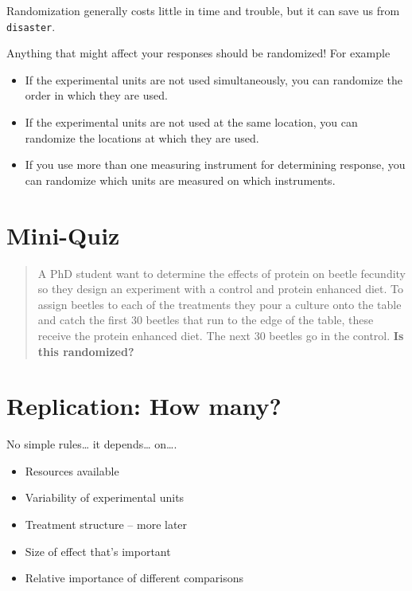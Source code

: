 \documentclass[
]{book}
\providecommand{\tightlist}{%
  \setlength{\itemsep}{0pt}\setlength{\parskip}{0pt}}
\begin{document}
Randomization generally costs little in time and trouble, but it can save us from \texttt{disaster}.

Anything that might affect your responses should be randomized! For example

\begin{itemize}
\tightlist
\item
  If the experimental units are not used simultaneously, you can randomize the order in which they are used.
\item
  If the experimental units are not used at the same location, you can randomize the locations at which they are used.
\item
  If you use more than one measuring instrument for determining response, you can randomize which units are measured on which instruments.
\end{itemize}

\hypertarget{mini-quiz}{%
\section{Mini-Quiz}\label{mini-quiz}}

\begin{quote}
A PhD student want to determine the effects of protein on beetle fecundity so they design an experiment with a control and protein enhanced diet. To assign beetles to each of the treatments they pour a culture onto the table and catch the first 30 beetles that run to the edge of the table, these receive the protein enhanced diet. The next 30 beetles go in the control. \textbf{Is this randomized?}
\end{quote}

\hypertarget{replication-how-many}{%
\section{Replication: How many?}\label{replication-how-many}}

No simple rules\ldots{} it depends\ldots{} on\ldots.

\begin{itemize}
\tightlist
\item
  Resources available
\item
  Variability of experimental units
\item
  Treatment structure -- more later
\item
  Size of effect that's important
\item
  Relative importance of different comparisons
\end{itemize}
\end{document}
